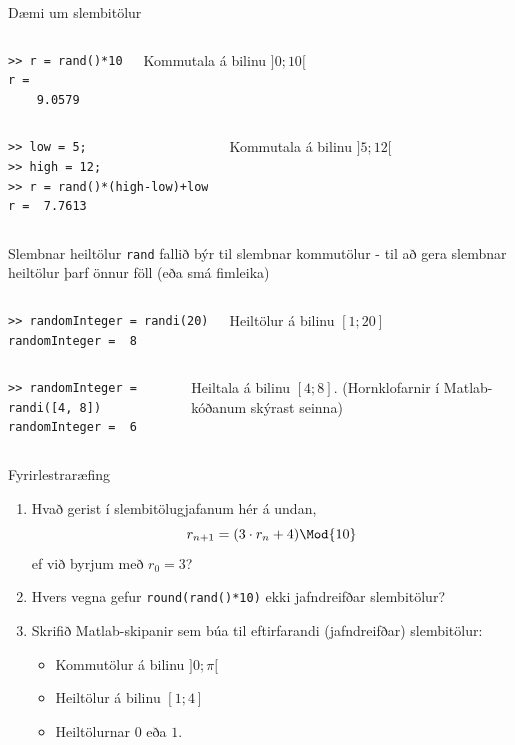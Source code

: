 \documentclass[handout]{beamer}
\begin{document}
\begin{frame}[fragile]{Dæmi um slembitölur}
\vspace{-0.5cm}
\begin{columns}
\begin{verbatim}
>> r = rand()*10
r =
    9.0579
\end{verbatim}
Kommutala á bilinu $]0;10[$
\end{columns}

\begin{columns}
\begin{verbatim}
>> low = 5;
>> high = 12;
>> r = rand()*(high-low)+low
r =  7.7613
\end{verbatim}
Kommutala á bilinu $]5;12[$
\end{columns}
\end{frame}

\begin{frame}[fragile]{Slembnar heiltölur}
\texttt{rand} fallið býr til slembnar kommutölur - til að gera slembnar heiltölur þarf önnur föll (eða smá fimleika)
\begin{columns}
\begin{verbatim}
>> randomInteger = randi(20)
randomInteger =  8
\end{verbatim}
Heiltölur á bilinu $[1;20]$
\end{columns}

\begin{columns}
\begin{verbatim}
>> randomInteger = randi([4, 8])
randomInteger =  6
\end{verbatim}
Heiltala á bilinu $[4; 8]$. (Hornklofarnir í Matlab-kóðanum skýrast seinna)
\end{columns}
\end{frame}

\begin{frame}{Fyrirlestraræfing}
\begin{enumerate}
 \item Hvað gerist í slembitölugjafanum hér á undan, 
 \[
  r_{n+1} = (3\cdot r_n + 4) \Mod{10}
 \]
 ef við byrjum með $r_0 = 3$?
 \item Hvers vegna gefur \texttt{round(rand()*10)} ekki jafndreifðar slembitölur?
 \item Skrifið Matlab-skipanir sem búa til eftirfarandi (jafndreifðar) slembitölur:
 \begin{itemize}
  \item Kommutölur á bilinu $]0;\pi[$
  \item Heiltölur á bilinu $[1;4]$
  \item Heiltölurnar $0$ eða $1$.
 \end{itemize}
\end{enumerate}
\end{frame}
\end{document}
